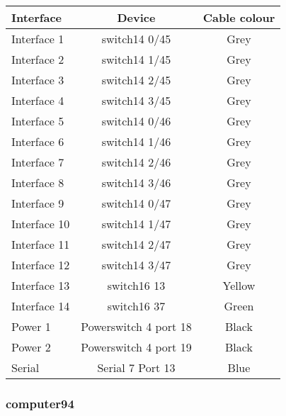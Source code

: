 \begin{table}[H]
\begin{tabular}{|l|c|c|}\hline
Interface & Device & Cable colour \\ \hline
Interface 1 & switch14 0/45 & Grey \\
Interface 2 & switch14 1/45 & Grey \\
Interface 3 & switch14 2/45 & Grey \\
Interface 4 & switch14 3/45 & Grey \\
Interface 5 & switch14 0/46 & Grey \\
Interface 6 & switch14 1/46 & Grey \\
Interface 7 & switch14 2/46 & Grey \\
Interface 8 & switch14 3/46 & Grey \\
Interface 9 & switch14 0/47 & Grey \\
Interface 10 & switch14 1/47 & Grey \\
Interface 11 & switch14 2/47 & Grey \\
Interface 12 & switch14 3/47 & Grey \\
Interface 13 & switch16 13 & Yellow \\
Interface 14 & switch16 37 & Green \\
Power 1 & Powerswitch 4 port 18 & Black \\
Power 2 & Powerswitch 4 port 19 & Black \\
Serial & Serial 7 Port 13 & Blue \\ \hline
\end{tabular}
\end{table}

\subsubsection{computer94}

